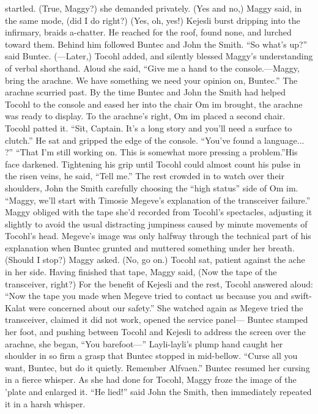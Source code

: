 \documentclass[9pt]{article}
\begin{document}
startled. (True, Maggy?) she demanded privately.
(Yes and no,) Maggy said, in the same mode, (did I do right?)
(Yes, oh, yes!)
Kejesli burst dripping into the infirmary, braids a-chatter. He reached for the roof, found none, and
lurched toward them. Behind him followed Buntec and John the Smith. “So what’s up?” said Buntec.
(—Later,) Tocohl added, and silently blessed Maggy’s understanding of verbal shorthand. Aloud she
said, “Give me a hand to the console.—Maggy, bring the arachne. We have something we need your
opinion on, Buntec.”
The arachne scurried past. By the time Buntec and John the Smith had helped Tocohl to the console
and eased her into the chair Om im brought, the arachne was ready to display. To the arachne’s right,
Om im placed a second chair. Tocohl patted it. “Sit, Captain. It’s a long story and you’ll need a surface
to clutch.”
He sat and gripped the edge of the console. “You’ve found a language... ?”
“That I’m still working on. This is somewhat more pressing a problem.”His face darkened. Tightening his grip until Tocohl could almost count his pulse in the risen veins, he
said, “Tell me.” The rest crowded in to watch over their shoulders, John the Smith carefully choosing the
“high status” side of Om im.
“Maggy, we’ll start with Timosie Megeve’s explanation of the transceiver failure.”
Maggy obliged with the tape she’d recorded from Tocohl’s spectacles, adjusting it slightly to avoid
the usual distracting jumpiness caused by minute movements of Tocohl’s head. Megeve’s image was only
halfway through the technical part of his explanation when Buntec grunted and muttered something under
her breath.
(Should I stop?) Maggy asked.
(No, go on.) Tocohl sat, patient against the ache in her side. Having finished that tape, Maggy said,
(Now the tape of the transceiver, right?)
For the benefit of Kejesli and the rest, Tocohl answered aloud: “Now the tape you made when
Megeve tried to contact us because you and swift-Kalat were concerned about our safety.” She watched
again as Megeve tried the transceiver, claimed it did not work, opened the service panel—
Buntec stamped her foot, and pushing between Tocohl and Kejesli to address the screen over the
arachne, she began, “You barefoot—”
Layli-layli’s plump hand caught her shoulder in so firm a grasp that Buntec stopped in mid-bellow.
“Curse all you want, Buntec, but do it quietly. Remember Alfvaen.” Buntec resumed her cursing in a
fierce whisper.
As she had done for Tocohl, Maggy froze the image of the ’plate and enlarged it. “He lied!” said
John the Smith, then immediately repeated it in a harsh whisper.
\end{document}
